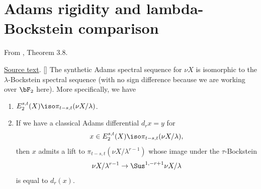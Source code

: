 \section{Adams rigidity and lambda-Bockstein comparison}

\begin{theorem}
\label{paper:3.8}
From \cite{LWX126}, Theorem 3.8.\par

\href{paper/main.tex.html#L813}{Source text}.
[{\cite[Theorem A.1]{BHS}}]\label{thm:17e90ac0}
    The synthetic Adams spectral sequence for $\nu X$ is isomorphic to the $\lambda$-Bockstein spectral sequence (with no sign difference because we are working over $\bF_2$ here). More specifically, we have
    \begin{enumerate}
        \item $E_2^{s,t}(X)\iso \pi_{t-s,t}(\nu X /\lambda)$.
        \item If we have a classical Adams differential $d_rx=y$ for 
        $$x\in E_2^{s,t}(X)\iso \pi_{t-s,t}(\nu X /\lambda),$$
        then $x$ admits a lift to $\pi_{t-s,t}(\nu X/\lambda^{r-1})$ whose image under the $\tau$-Bockstein
        $$\nu X/\lambda^{r-1}\to \Sus^{1,-r+1}\nu X/\lambda$$
        is equal to $d_r(x)$.
    \end{enumerate}




\end{theorem}
